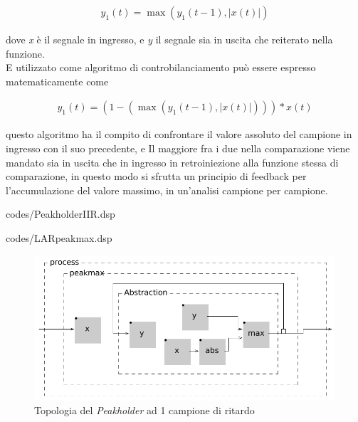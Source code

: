 \begin{align*} 
    y_{1}(t) = \max\left( y_{1}(t\!-\!1), \left\lvert{x(t)}\right\rvert \right) 
\end{align*}

dove \textit{x} è il segnale in ingresso, e \textit{y} il segnale sia in uscita che reiterato nella funzione. \\
E utilizzato come algoritmo di controbilanciamento può essere espresso matematicamente come

\begin{align*} 
    y_{1}(t) = (1-(\max\left( y_{1}(t\!-\!1), \left\lvert{x(t)}\right\rvert \right))) * x(t)
\end{align*}

questo algoritmo ha il compito di confrontare il valore assoluto del campione in ingresso con il suo precedente,
e Il maggiore fra i due nella comparazione viene mandato sia in uscita che in ingresso 
in retroiniezione alla funzione stessa di comparazione, 
in questo modo si sfrutta un principio di feedback per l'accumulazione
del valore massimo, in un'analisi campione per campione.

\vspace{0.5cm} 

{codes/PeakholderIIR.dsp}

\vspace{0.5cm} 

{codes/LARpeakmax.dsp}

\begin{figure}[h!]
\begin{center}
    \includegraphics[width=14cm]{figures/PeakholderIIR.pdf}
    \caption{Topologia del \textit{Peakholder} ad 1 campione di ritardo} 
    \end{center}
\end{figure} 

